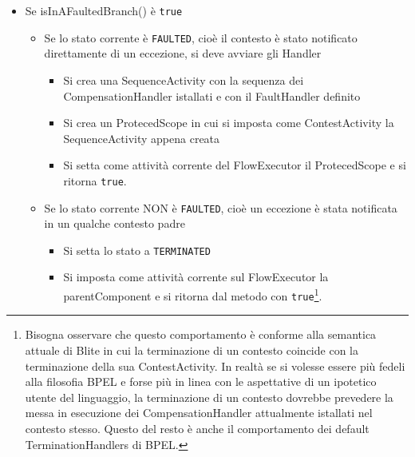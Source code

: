 \begin{itemize}
  \item Se isInAFaultedBranch() \`e \texttt{true}
  	\begin{itemize}
    	\item Se lo stato corrente \`e \texttt{FAULTED}, cioè il contesto \`e
    	stato notificato direttamente di un eccezione, si deve avviare gli Handler
    		 \begin{itemize}
             	\item Si crea una SequenceActivity con la sequenza dei
             	CompensationHandler istallati e con il FaultHandler definito
             	\item Si crea un ProtecedScope in cui si imposta come
             	ContestActivity la SequenceActivity appena creata
             	\item Si setta come attività corrente del FlowExecutor il
             	ProtecedScope e si ritorna \texttt{true}.
             \end{itemize}    
    	\item Se lo stato corrente NON \`e \texttt{FAULTED}, cioè un eccezione
    	\`e stata notificata in un qualche contesto padre
    		 \begin{itemize}
             	\item Si setta lo stato a \texttt{TERMINATED}
             	\item Si imposta come attività corrente sul FlowExecutor la
                parentComponent e si ritorna dal metodo con
                \texttt{true}\footnote{Bisogna osservare che questo
                comportamento \`e conforme alla semantica attuale di Blite in
                cui la terminazione di un contesto coincide con la terminazione
                della sua ContestActivity. In realtà se si volesse essere più
                fedeli alla filosofia BPEL e forse più in linea con le
                aspettative di un ipotetico utente del linguaggio, la
                terminazione di un contesto dovrebbe prevedere la messa in
                esecuzione dei CompensationHandler attualmente istallati nel
                contesto stesso. Questo del resto \`e anche il comportamento
                dei default TerminationHandlers di BPEL.}.
             \end{itemize}
    \end{itemize}    
  

\end{itemize}
